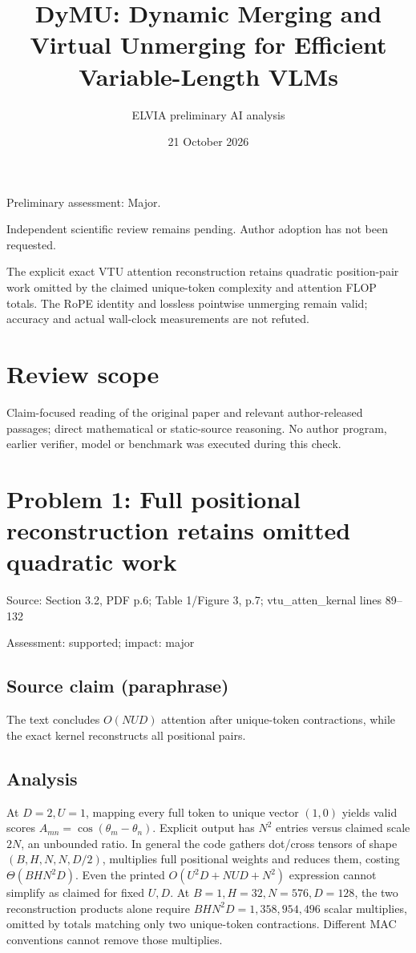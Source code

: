 \documentclass[11pt]{article}
\begin{document}
\title{DyMU: Dynamic Merging and Virtual Unmerging for Efficient Variable-Length VLMs}

\author{ELVIA preliminary AI analysis}\date{21 October 2026}\maketitle

Preliminary assessment: Major.\par

Independent scientific review remains pending. Author adoption has not been requested.

The explicit exact VTU attention reconstruction retains quadratic position-pair work omitted by the claimed unique-token complexity and attention FLOP totals. The RoPE identity and lossless pointwise unmerging remain valid; accuracy and actual wall-clock measurements are not refuted.

\section*{Review scope}

Claim-focused reading of the original paper and relevant author-released passages; direct mathematical or static-source reasoning. No author program, earlier verifier, model or benchmark was executed during this check.

\section*{Problem 1: Full positional reconstruction retains omitted quadratic work}

Source: Section 3.2, PDF p.6; Table 1/Figure 3, p.7; vtu\_atten\_kernal lines 89–132

Assessment: supported; impact: major

\subsection*{Source claim (paraphrase)}

The text concludes \(O(NUD)\) attention after unique-token contractions, while the exact kernel reconstructs all positional pairs.

\subsection*{Analysis}

At \(D=2,U=1\), mapping every full token to unique vector \((1,0)\) yields valid scores \(A_{mn}=\cos(\theta_m-\theta_n)\). Explicit output has \(N^2\) entries versus claimed scale \(2N\), an unbounded ratio. In general the code gathers dot/cross tensors of shape \((B,H,N,N,D/2)\), multiplies full positional weights and reduces them, costing \(\Theta(BHN^2D)\). Even the printed \(O(U^2D+NUD+N^2)\) expression cannot simplify as claimed for fixed \(U,D\). At \(B=1,H=32,N=576,D=128\), the two reconstruction products alone require \(BHN^2D=1{,}358{,}954{,}496\) scalar multiplies, omitted by totals matching only two unique-token contractions. Different MAC conventions cannot remove those multiplies.
\end{document}
